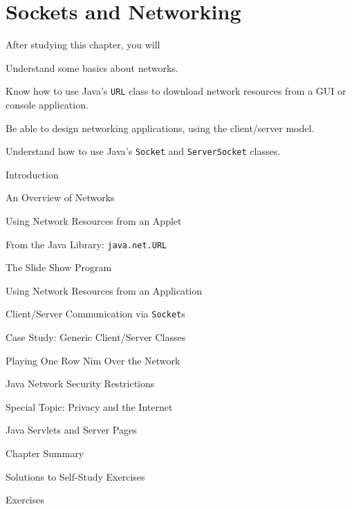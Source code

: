 
\setcounter{SSTUDYcount}{1}
\setcounter{chapter}{14}

\chapter{Sockets and Networking}
\label{chapter-sockets}


\CObegin
{}
\label{objectives}
\noindent After studying this chapter, you will

\begin{COBL}
\item  Understand some basics about networks.
\item  Know how to use Java's {\tt URL} class
to download network resources from a GUI or console application.
\item  Be able to design networking applications,
using the client/server model.
\item  Understand how to use Java's {\tt Socket}
and {\tt ServerSocket} classes.
\end{COBL}

\label{outline}
\begin{COL}
\item {Introduction}
\item {An Overview of Networks}
\item {Using Network Resources from an Applet}
\item {From the Java Library: {\tt java.net.URL}}
\item {The Slide Show Program}
\item {Using Network Resources from an Application}
\item {Client/Server Communication via {\tt Socket}s}
\item {Case Study: Generic Client/Server Classes}
\item {Playing One Row Nim Over the Network}
\item {Java Network Security Restrictions}
\item[] {{\color{cyan}Special Topic:} Privacy and the Internet}
\item {Java Servlets and Server Pages}
\par\small\item[] {Chapter Summary}
\par\small\item[] {Solutions to Self-Study Exercises}
\par\small\item[] {Exercises}
\end{COL}
\COend

